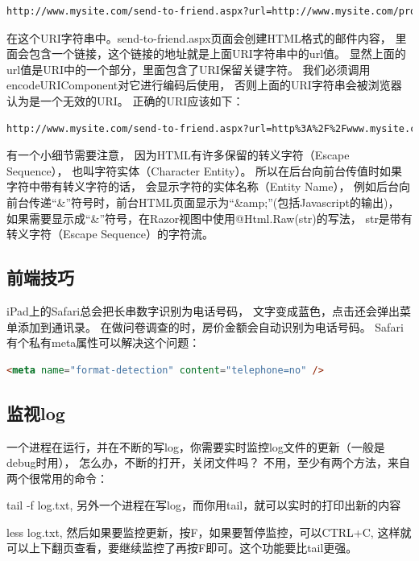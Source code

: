 \documentclass{book}
\begin{document}
\begin{lstlisting}[language=HTML]
http://www.mysite.com/send-to-friend.aspx?url=http://www.mysite.com/product.html 
\end{lstlisting}

在这个URI字符串中。send-to-friend.aspx页面会创建HTML格式的邮件内容，
里面会包含一个链接，这个链接的地址就是上面URI字符串中的url值。
显然上面的url值是URI中的一个部分，里面包含了URI保留关键字符。
我们必须调用encodeURIComponent对它进行编码后使用，
否则上面的URI字符串会被浏览器认为是一个无效的URI。
正确的URI应该如下： 

\begin{lstlisting}[language=HTML]
http://www.mysite.com/send-to-friend.aspx?url=http%3A%2F%2Fwww.mysite.com%2Fproduct.html 
\end{lstlisting}
 
有一个小细节需要注意，
因为HTML有许多保留的转义字符（Escape Sequence），
也叫字符实体（Character Entity）。
所以在后台向前台传值时如果字符中带有转义字符的话，
会显示字符的实体名称（Entity Name），
例如后台向前台传递“\&”符号时，前台HTML页面显示为“\&amp;”(包括Javascript的输出)，
如果需要显示成“\&”符号，在Razor视图中使用@Html.Raw(str)的写法，
str是带有转义字符（Escape Sequence）的字符流。

\subsection{前端技巧}

iPad上的Safari总会把长串数字识别为电话号码，
文字变成蓝色，点击还会弹出菜单添加到通讯录。
在做问卷调查的时，房价金额会自动识别为电话号码。
Safari有个私有meta属性可以解决这个问题：

\begin{lstlisting}[language=HTML]
<meta name="format-detection" content="telephone=no" />
\end{lstlisting}

\subsection{监视log}

一个进程在运行，并在不断的写log，你需要实时监控log文件的更新（一般是debug时用），
怎么办，不断的打开，关闭文件吗？ 不用，至少有两个方法，来自两个很常用的命令：

tail -f log.txt, 另外一个进程在写log，而你用tail，就可以实时的打印出新的内容

less log.txt, 然后如果要监控更新，按F，如果要暂停监控，可以CTRL+C, 这样就可以上下翻页查看，要继续监控了再按F即可。这个功能要比tail更强。
\end{document}
